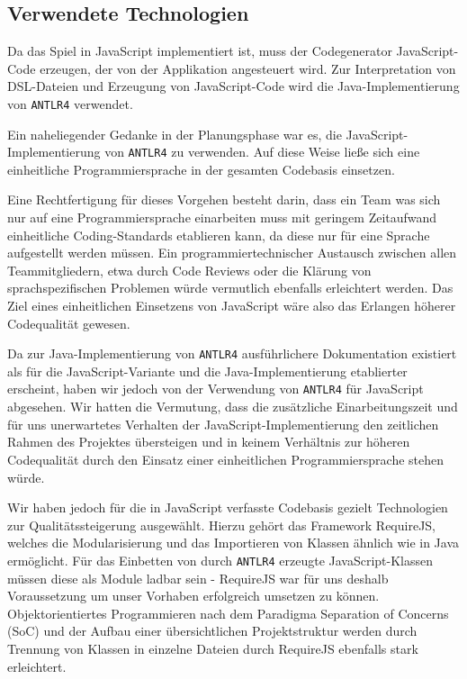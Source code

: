 \documentclass[conference]{IEEEtran}
\begin{document}
\subsection{Verwendete Technologien}
Da das Spiel in JavaScript implementiert ist, muss der Codegenerator JavaScript-Code erzeugen, der von der Applikation angesteuert wird. Zur Interpretation von DSL-Dateien und Erzeugung von JavaScript-Code wird die Java-Implementierung von \texttt{ANTLR4} verwendet.

Ein naheliegender Gedanke in der Planungsphase war es, die JavaScript-Implementierung von \texttt{ANTLR4} zu verwenden. Auf diese Weise ließe sich eine einheitliche Programmiersprache in der gesamten Codebasis  einsetzen.

Eine Rechtfertigung für dieses Vorgehen besteht darin, dass ein Team was sich nur auf eine Programmiersprache einarbeiten muss mit geringem Zeitaufwand einheitliche Coding-Standards etablieren kann, da diese nur für eine Sprache aufgestellt werden müssen.  Ein programmiertechnischer Austausch zwischen allen Teammitgliedern,  etwa durch Code Reviews oder die Klärung von sprachspezifischen  Problemen würde vermutlich ebenfalls erleichtert werden. Das Ziel eines einheitlichen Einsetzens von JavaScript wäre also das Erlangen höherer Codequalität gewesen.

Da zur Java-Implementierung von \texttt{ANTLR4} ausführlichere Dokumentation existiert als für die JavaScript-Variante und die Java-Implementierung etablierter erscheint, haben wir jedoch von der Verwendung von \texttt{ANTLR4} für JavaScript abgesehen. Wir hatten die Vermutung, dass die zusätzliche Einarbeitungszeit und für uns unerwartetes Verhalten der JavaScript-Implementierung den zeitlichen Rahmen des Projektes übersteigen und in keinem Verhältnis zur  höheren Codequalität durch den Einsatz einer einheitlichen Programmiersprache stehen würde.

Wir haben jedoch für die in JavaScript verfasste Codebasis gezielt Technologien zur Qualitätssteigerung ausgewählt. Hierzu gehört das Framework RequireJS, welches die Modularisierung und das Importieren von Klassen ähnlich wie in Java ermöglicht. Für das Einbetten von durch \texttt{ANTLR4} erzeugte JavaScript-Klassen müssen diese als Module ladbar sein - RequireJS war für uns deshalb Voraussetzung um unser  Vorhaben erfolgreich umsetzen zu können. Objektorientiertes Programmieren nach dem Paradigma Separation of Concerns (SoC) und der Aufbau einer übersichtlichen Projektstruktur werden durch Trennung von Klassen in einzelne Dateien durch RequireJS ebenfalls stark erleichtert.
\end{document}
